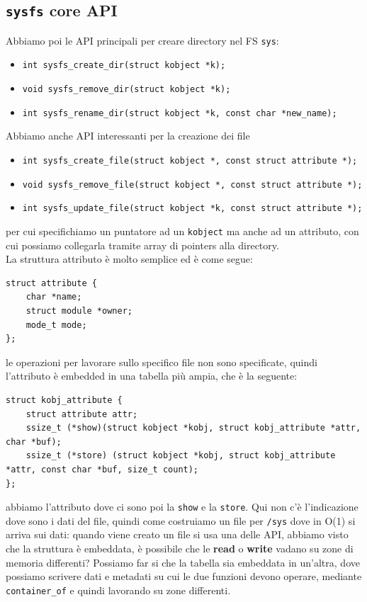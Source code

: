 \documentclass[12pt, oneside]{extbook}
\begin{document}
\subsection{\texttt{sysfs} core API}
Abbiamo poi le API principali per creare directory nel FS \texttt{sys}:
\begin{itemize}
	\item \texttt{int sysfs\_create\_dir(struct kobject *k);}
	\item \texttt{void sysfs\_remove\_dir(struct kobject *k);}
	\item \texttt{int sysfs\_rename\_dir(struct kobject *k, const char *new\_name);}
\end{itemize}
Abbiamo anche API interessanti per la creazione dei file
\begin{itemize}
	\item \texttt{int sysfs\_create\_file(struct kobject *, const struct attribute *);}
	\item \texttt{void sysfs\_remove\_file(struct kobject *, const struct attribute *);}
	\item \texttt{int sysfs\_update\_file(struct kobject *k, const struct attribute *);}
\end{itemize}
per cui specifichiamo un puntatore ad un \texttt{kobject} ma anche ad un attributo, con cui possiamo collegarla tramite array di pointers alla directory.\\La struttura attributo è molto semplice ed è come segue:
\begin{lstlisting}
struct attribute {
	char *name;
	struct module *owner;
	mode_t mode;
};
\end{lstlisting}
le operazioni per lavorare sullo specifico file non sono specificate, quindi l'attributo è embedded in una tabella più ampia, che è la seguente:
\begin{lstlisting}
struct kobj_attribute {
	struct attribute attr;
	ssize_t (*show)(struct kobject *kobj, struct kobj_attribute *attr, char *buf);
	ssize_t (*store) (struct kobject *kobj, struct kobj_attribute *attr, const char *buf, size_t count);
};
\end{lstlisting}
abbiamo l'attributo dove ci sono poi la \texttt{show} e la \texttt{store}. Qui non c'è l'indicazione dove sono i dati del file, quindi come costruiamo un file per \texttt{/sys} dove in O(1) si arriva sui dati: quando viene creato un file si usa una delle API, abbiamo visto che la struttura è embeddata, è possibile che le \textbf{read} o \textbf{write} vadano su zone di memoria differenti? Possiamo far si che la tabella sia embeddata in un'altra, dove possiamo scrivere dati e metadati su cui le due funzioni devono operare, mediante \texttt{container\_of} e quindi lavorando su zone differenti.
\end{document}
